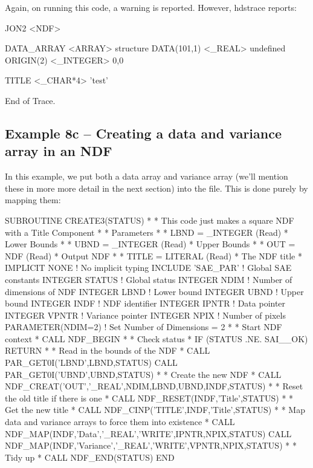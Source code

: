 \documentclass[11pt,nolof]{starlink}
\begin{document}
Again, on running this code, a warning is reported. However,
\textsf{hdstrace} reports:

\begin{small}
\begin{terminalv}
JON2  <NDF>

   DATA_ARRAY     <ARRAY>         {structure}
      DATA(101,1)    <_REAL>         {undefined}
      ORIGIN(2)      <_INTEGER>      0,0

   TITLE          <_CHAR*4>       'test'

End of Trace.
\end{terminalv}
\end{small}

\subsection{Example 8c -- Creating a data and variance array in an NDF}

In this example, we put both a data array and variance array (we'll
mention these in more more detail in the next section) into the file.
This is done purely by mapping them:

\begin{small}
\begin{terminalv}
       SUBROUTINE CREATE3(STATUS)
*
* This code just makes a square NDF with a Title Component
*
* Parameters
*
* LBND = _INTEGER (Read)
*  Lower Bounds
*
* UBND =  _INTEGER (Read)
*  Upper Bounds
*
* OUT = NDF (Read)
*  Output NDF
*
* TITLE = LITERAL (Read)
*  The NDF title
*
       IMPLICIT NONE     ! No implicit typing
       INCLUDE 'SAE_PAR' ! Global SAE constants
       INTEGER STATUS    ! Global status
       INTEGER NDIM      ! Number of dimensions of NDF
       INTEGER LBND      ! Lower bound
       INTEGER UBND      ! Upper bound
       INTEGER INDF      ! NDF identifier
       INTEGER IPNTR     ! Data pointer
       INTEGER VPNTR     ! Variance pointer
       INTEGER NPIX      ! Number of pixels
       PARAMETER(NDIM=2) ! Set Number of Dimensions = 2
*
* Start NDF context
*
       CALL NDF_BEGIN
*
* Check status
*
       IF (STATUS .NE. SAI__OK) RETURN
*
* Read in the bounds of the NDF
*
       CALL PAR_GET0I('LBND',LBND,STATUS)
       CALL PAR_GET0I('UBND',UBND,STATUS)
*
* Create the new NDF
*
       CALL NDF_CREAT('OUT','_REAL',NDIM,LBND,UBND,INDF,STATUS)
*
* Reset the old title if there is one
*
       CALL NDF_RESET(INDF,'Title',STATUS)
*
* Get the new title
*
       CALL NDF_CINP('TITLE',INDF,'Title',STATUS)
*
* Map data and variance arrays to force them into existence
*
       CALL NDF_MAP(INDF,'Data','_REAL','WRITE',IPNTR,NPIX,STATUS)
       CALL NDF_MAP(INDF,'Variance','_REAL','WRITE',VPNTR,NPIX,STATUS)
*
* Tidy up
*
       CALL NDF_END(STATUS)
       END
\end{terminalv}
\end{small}
\end{document}
